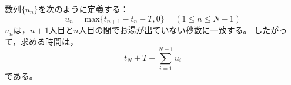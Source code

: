 \documentclass{article}
\begin{document}
数列$\{u_n\}$を次のように定義する：
\begin{equation*}
    u_n = \mathrm{max}\{t_{n + 1} - t_n - T, 0\} \hspace{15pt} (1 \leq n \leq N - 1)
\end{equation*}
$u_n$は，$n + 1$人目と$n$人目の間でお湯が出ていない秒数に一致する。
したがって，求める時間は，
\begin{equation*}
    t_N + T - \sum_{i = 1}^{N - 1} u_i
\end{equation*}
である。
\end{document}
